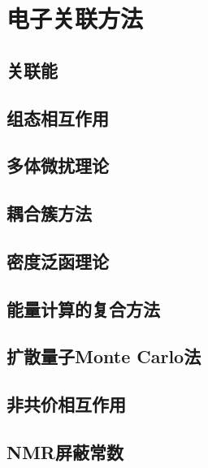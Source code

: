 \chapter{电子关联方法}
\label{chap:16}
\section{关联能}
\label{sec:16.1 Correlation Energy}

\section{组态相互作用}
\label{sec:16.2 Configuration Interaction}

\section{多体微扰理论}
\label{sec:16.3 MP Perturbation Theory}

\section{耦合簇方法}
\label{sec:16.4 The Coupled-Cluster Method}

\section{密度泛函理论}
\label{sec:16.5 Density-Functional Theory}

\section{能量计算的复合方法}
\label{sec:16.6 Composite Methods for Energy Calculations}

\section{扩散量子Monte Carlo法}
\label{sec:16.7 The Diffusion Quantum Monte Carlo Method}

\section{非共价相互作用}
\label{sec:16.8 Noncovalent Interactions}

\section{NMR屏蔽常数}
\label{sec:16.9 NMR Shielding Constants}

